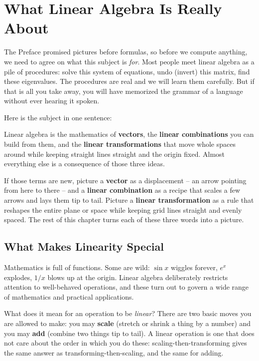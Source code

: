 \chapter{What Linear Algebra Is Really About}

The Preface promised pictures before formulas, so before we compute anything, we need to agree on
what this subject is \emph{for}. Most people meet linear algebra as a pile of
procedures: solve this system of equations, undo (invert) this matrix, find these eigenvalues. The
procedures are real and we will learn them carefully. But if that is all you take away, you will have
memorized the grammar of a language without ever hearing it spoken.

Here is the subject in one sentence:

\begin{focusbox}
Linear algebra is the mathematics of \textbf{vectors}, the \textbf{linear combinations} you can
build from them, and the \textbf{linear transformations} that move whole spaces around while keeping
straight lines straight and the origin fixed. Almost everything else is a consequence of those three
ideas.
\end{focusbox}

If those terms are new, picture a \textbf{vector} as a displacement -- an arrow pointing
from here to there -- and a \textbf{linear combination} as a recipe that scales a few
arrows and lays them tip to tail. Picture a \textbf{linear transformation} as a rule that
reshapes the entire plane or space while keeping grid lines straight and evenly spaced. The rest of
this chapter turns each of these three words into a picture.

\section{What Makes Linearity Special}

Mathematics is full of functions. Some are wild: $\sin x$ wiggles forever, $e^x$ explodes,
$1/x$ blows up at the origin. Linear algebra deliberately restricts attention to well-behaved
operations, and these turn out to govern a wide range of mathematics and
practical applications.

What does it mean for an operation to be \emph{linear}? There are
two basic moves you are allowed to make: you may \textbf{scale} (stretch or shrink a thing by a number) and
you may \textbf{add} (combine two things tip to tail). A linear operation is one that does not care
about the order in which you do these: scaling-then-transforming gives the same answer as
transforming-then-scaling, and the same for adding.

